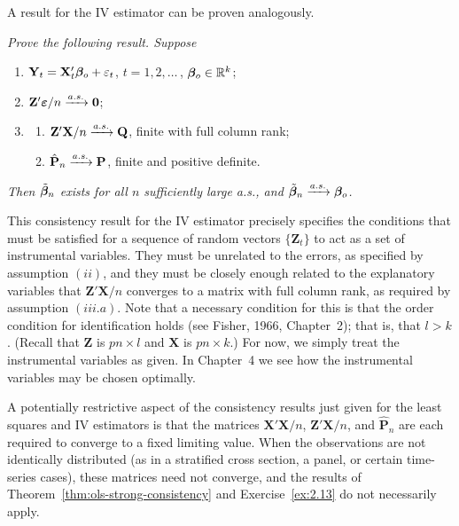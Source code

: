 A result for the IV estimator can be proven analogously.

\begin{exercises}
\item\label{ex:2.13} \emph{Prove the following result. Suppose}
\begin{enumerate}[label=$(\roman*)$]
\item $\mathbf{Y}_t = \mathbf{X}_t'\boldsymbol{\beta}_o + \varepsilon_t$, \quad $t = 1, 2, \ldots$\,, $\boldsymbol{\beta}_o \in \mathbb{R}^k$;
\item $\mathbf{Z}'\boldsymbol{\varepsilon}/n \xrightarrow{a.s.} \mathbf{0}$;
\item[\emph{(iii)}] \begin{enumerate}[label=$(\alph*)$]
\item $\mathbf{Z}'\mathbf{X}/n \xrightarrow{a.s.} \mathbf{Q}$, finite with full column rank;
\item $\hat{\mathbf{P}}_n \xrightarrow{a.s.} \mathbf{P}$, finite and positive definite.
\end{enumerate}
\end{enumerate}
\emph{Then $\tilde{\boldsymbol{\beta}}_n$ exists for all $n$ sufficiently large a.s., and $\tilde{\boldsymbol{\beta}}_n \xrightarrow{a.s.} \boldsymbol{\beta}_o$.}
\end{exercises}

This consistency result for the IV estimator precisely specifies the conditions that must be satisfied for a sequence of random vectors $\{\mathbf{Z}_t\}$ to act
as a set of instrumental variables. They must be unrelated to the errors, as
specified by assumption $(ii)$, and they must be closely enough related to the
explanatory variables that $\mathbf{Z}'\mathbf{X}/n$ converges to a matrix with full column
rank, as required by assumption $(iii.a)$. Note that a necessary condition for
this is that the order condition for identification holds (see Fisher, 1966,
Chapter~2); that is, that $l > k$. (Recall that $\mathbf{Z}$ is $pn \times l$ and $\mathbf{X}$ is $pn \times k$.)
For now, we simply treat the instrumental variables as given. In Chapter~4
we see how the instrumental variables may be chosen optimally.

A potentially restrictive aspect of the consistency results just given for
the least squares and IV estimators is that the matrices $\mathbf{X}'\mathbf{X}/n$, $\mathbf{Z}'\mathbf{X}/n$,
and $\hat{\mathbf{P}}_n$ are each required to converge to a fixed limiting value. When the
observations are not identically distributed (as in a stratified cross section,
a panel, or certain time-series cases), these matrices need not converge, and
the results of Theorem~\ref{thm:ols-strong-consistency} and Exercise~\ref{ex:2.13} do not necessarily apply.

